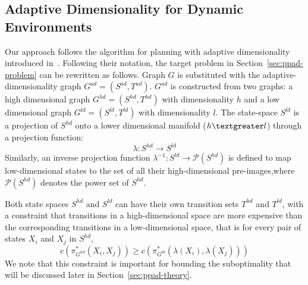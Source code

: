 \subsection{Adaptive Dimensionality for Dynamic Environments}
Our approach follows the algorithm for planning with adaptive dimensionality introduced in~\cite{gochev2011path}.
Following their notation, the target problem in Section~\ref{sec:ppad-problem} can be rewritten as follows.
Graph $G$ is substituted with the adaptive-dimensionality graph $G^{ad} = (S^{ad}, T^{ad})$. $G^{ad}$ is constructed from two graphs: a high dimensional graph $G^{hd} = (S^{hd}, T^{hd})$ with dimensionality $h$ and a low dimensional graph $G^{ld} = (S^{ld}, T^{ld})$ with dimensionality $l$. The state-space $S^{ld}$ is a projection of $S^{hd}$ onto a lower dimensional manifold ($ h \textgreater l$) through a projection function:
\begin{equation}
\lambda : S^{hd} \rightarrow S^{ld}
\end{equation}\label{eq:ppad-lambda}
Similarly, an inverse projection function $\lambda^{-1} : S^{ld} \rightarrow \mathcal{P}(S^{hd})$ is defined to map low-dimensional states to the set of all their high-dimensional pre-images,where $\mathcal{P}(S^{hd})$ denotes the power set of $S^{hd}$.

Both state spaces $S^{hd}$ and $S^{ld}$ can have their own transition sets $T^{hd}$ and $T^{ld}$,
with a constraint that transitions in a high-dimensional space are more expensive than the corresponding transitions in a low-dimensional space, that is for every pair of states $X_i$ and $X_j$ in $S^{hd}$,
\begin{equation}
c(\pi^*_{G^{hd}}(X_i,X_j)) \geq c(\pi^*_{G^{ld}}(\lambda(X_i), \lambda(X_j)))
\label{eq:ppad-cost}
\end{equation}
We note that this constraint is important for bounding the suboptimality that will be discussed later in Section~\ref{sec:ppad-theory}.



